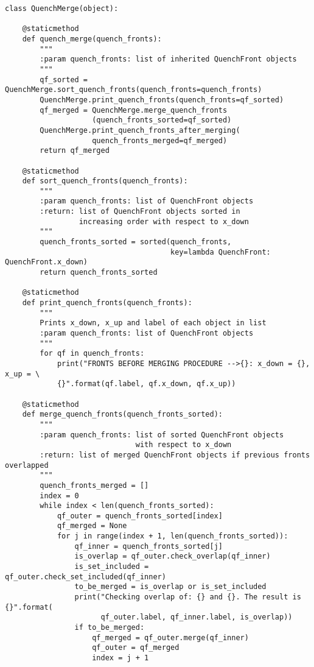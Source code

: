 \begin{verbatim}
class QuenchMerge(object):

    @staticmethod
    def quench_merge(quench_fronts):
        """
        :param quench_fronts: list of inherited QuenchFront objects
        """
        qf_sorted = QuenchMerge.sort_quench_fronts(quench_fronts=quench_fronts)
        QuenchMerge.print_quench_fronts(quench_fronts=qf_sorted)
        qf_merged = QuenchMerge.merge_quench_fronts
                    (quench_fronts_sorted=qf_sorted)
        QuenchMerge.print_quench_fronts_after_merging(
                    quench_fronts_merged=qf_merged)
        return qf_merged

    @staticmethod
    def sort_quench_fronts(quench_fronts):
        """
        :param quench_fronts: list of QuenchFront objects
        :return: list of QuenchFront objects sorted in 
                 increasing order with respect to x_down
        """
        quench_fronts_sorted = sorted(quench_fronts, 
                                      key=lambda QuenchFront: QuenchFront.x_down)
        return quench_fronts_sorted

    @staticmethod
    def print_quench_fronts(quench_fronts):
        """
        Prints x_down, x_up and label of each object in list
        :param quench_fronts: list of QuenchFront objects
        """
        for qf in quench_fronts:
            print("FRONTS BEFORE MERGING PROCEDURE -->{}: x_down = {}, x_up = \ 
            {}".format(qf.label, qf.x_down, qf.x_up))

    @staticmethod
    def merge_quench_fronts(quench_fronts_sorted):
        """
        :param quench_fronts: list of sorted QuenchFront objects 
                              with respect to x_down
        :return: list of merged QuenchFront objects if previous fronts overlapped
        """
        quench_fronts_merged = []
        index = 0
        while index < len(quench_fronts_sorted):
            qf_outer = quench_fronts_sorted[index]
            qf_merged = None
            for j in range(index + 1, len(quench_fronts_sorted)):
                qf_inner = quench_fronts_sorted[j]
                is_overlap = qf_outer.check_overlap(qf_inner)
                is_set_included = qf_outer.check_set_included(qf_inner)
                to_be_merged = is_overlap or is_set_included
                print("Checking overlap of: {} and {}. The result is {}".format(
                      qf_outer.label, qf_inner.label, is_overlap))
                if to_be_merged:
                    qf_merged = qf_outer.merge(qf_inner)
                    qf_outer = qf_merged
                    index = j + 1


\end{verbatim}
